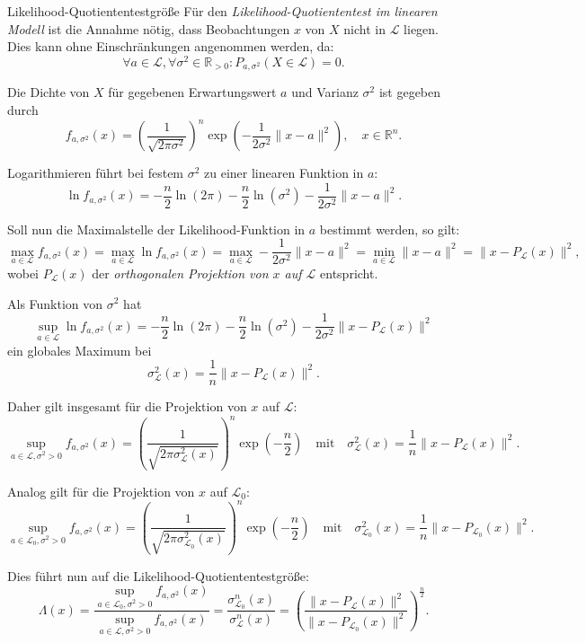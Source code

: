\begin{defi}{Likelihood-Quotiententestgröße}
    Für den \emph{Likelihood-Quotiententest im linearen Modell} ist die Annahme nötig, dass Beobachtungen $x$ von $X$ nicht in $\mathcal{L}$ liegen.
    Dies kann ohne Einschränkungen angenommen werden, da:
    \[
        \forall a \in \mathcal{L}, \forall \sigma^2 \in \mathbb{R}_{> 0} : P_{a, \sigma^2}(X \in \mathcal{L}) = 0.
    \]

    Die Dichte von $X$ für gegebenen Erwartungswert $a$ und Varianz $\sigma^2$ ist gegeben durch
    \[
        f_{a, \sigma^2}(x) = \left( \frac{1}{\sqrt{2 \pi \sigma^2}} \right)^n \exp \left( -\frac{1}{2 \sigma^2} \| x - a \|^2 \right), \quad x \in \mathbb{R}^n.
    \]

    Logarithmieren führt bei festem $\sigma^2$ zu einer linearen Funktion in $a$:
    \[
        \ln f_{a, \sigma^2}(x) = -\frac{n}{2} \ln(2 \pi) - \frac{n}{2} \ln(\sigma^2) - \frac{1}{2 \sigma^2} \| x - a \|^2.
    \]

    Soll nun die Maximalstelle der Likelihood-Funktion in $a$ bestimmt werden, so gilt:
    \[
        \max_{a \in \mathcal{L}} f_{a, \sigma^2}(x) = \max_{a \in \mathcal{L}} \ln f_{a, \sigma^2}(x) = \max_{a \in \mathcal{L}} -\frac{1}{2 \sigma^2} \| x - a \|^2 = \min_{a \in \mathcal{L}} \| x - a \|^2 = \| x - P_{\mathcal{L}}(x) \|^2,
    \]
    wobei $P_{\mathcal{L}}(x)$ der \emph{orthogonalen Projektion von $x$ auf $\mathcal{L}$} entspricht.

    Als Funktion von $\sigma^2$ hat
    \[
        \sup_{a \in \mathcal{L}} \ln f_{a, \sigma^2}(x) = -\frac{n}{2} \ln(2 \pi) - \frac{n}{2} \ln(\sigma^2) - \frac{1}{2 \sigma^2} \| x - P_{\mathcal{L}}(x) \|^2
    \]
    ein globales Maximum bei
    \[
        \sigma_{\mathcal{L}}^2(x) = \frac{1}{n} \| x - P_{\mathcal{L}}(x) \|^2.
    \]

    Daher gilt insgesamt für die Projektion von $x$ auf $\mathcal{L}$:
    \[
        \sup_{a \in \mathcal{L}, \sigma^2 > 0} f_{a, \sigma^2}(x) = \left( \frac{1}{\sqrt{2 \pi \sigma_{\mathcal{L}}^2(x)}} \right)^n \exp \left( -\frac{n}{2} \right) \quad \text{mit} \quad \sigma_{\mathcal{L}}^2(x) = \frac{1}{n} \| x - P_{\mathcal{L}}(x) \|^2.
    \]

    Analog gilt für die Projektion von $x$ auf $\mathcal{L}_0$:
    \[
        \sup_{a \in \mathcal{L}_0, \sigma^2 > 0} f_{a, \sigma^2}(x) = \left( \frac{1}{\sqrt{2 \pi \sigma_{\mathcal{L}_0}^2(x)}} \right)^n \exp \left( -\frac{n}{2} \right) \quad \text{mit} \quad \sigma_{\mathcal{L}_0}^2(x) = \frac{1}{n} \| x - P_{\mathcal{L}_0}(x) \|^2.
    \]

    Dies führt nun auf die Likelihood-Quotiententestgröße:
    \[
        \Lambda(x) = \frac{\sup_{a \in \mathcal{L}_0, \sigma^2 > 0} f_{a, \sigma^2}(x)}{\sup_{a \in \mathcal{L}, \sigma^2 > 0} f_{a, \sigma^2}(x)} = \frac{\sigma_{\mathcal{L}_0}^n(x)}{\sigma_{\mathcal{L}}^n(x)} = \left( \frac{\| x - P_{\mathcal{L}}(x) \|^2}{\| x - P_{\mathcal{L}_0}(x) \|^2} \right)^{\frac{n}{2}}.
    \]
\end{defi}

